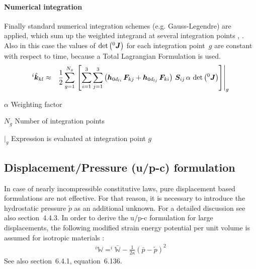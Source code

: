 \paragraph{Numerical integration}
Finally standard numerical integration schemes (e.g. Gauss-Legendre) are applied, which sum up the weighted integrand at several integration points \cite{BATHE2016}, \cite{KUEBLER2005}.
Also in this case the values of $\det{\left({^0}\bm{J}\right)}$ for each integration point~$g$ are constant with respect to time, because a Total Lagrangian Formulation is used.
\begin{eqnarray}
^i\hat{\bm{k}}_{kl} & \approx & \frac{1}{2} \sum_{g=1}^{N_g} \left.\left[ \sum_{i=1}^3 \sum_{j=1}^3 \left(\bm{h}_{0d_{li}} \, \bm{F}_{kj} + \bm{h}_{0d_{lj}} \, \bm{F}_{ki}\right) \, \bm{S}_{ij}  \, \alpha \, \det{\left({^0}\bm{J}\right)}\right]\right\vert_{g}
\end{eqnarray}
\begin{description}
\item{$\alpha$} Weighting factor
\item{$N_g$} Number of integration points
\item{$\vert_g$} Expression is evaluated at integration point $g$
\end{description}

\subsection{Displacement/Pressure (u/p-c) formulation}
\label{sec:solid:upc}
In case of nearly incompressible constitutive laws, pure displacement based formulations are not effective.
For that reason, it is necessary to introduce the hydrostatic pressure $\tilde{p}$ as an additional unknown.
For a detailed discussion see also \cite{BATHE2016} section~4.4.3.
In order to derive the u/p-c formulation for large displacements, the following modified strain energy potential
per unit volume is assumed for isotropic materials \cite{BATHE2016}:
\begin{eqnarray}
^i\mathbb{W} = ^i\bar{\mathbb{W}} - \frac{1}{2\kappa}\left(\bar{p} - \tilde{p}\right)^2 \label{eq:solid:upc:W}
\end{eqnarray}
See also \cite{BATHE2016} section~6.4.1, equation~6.136.

